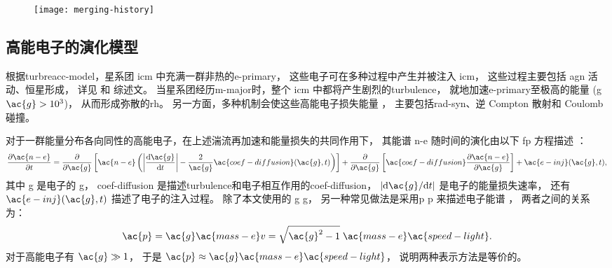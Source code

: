 \begin{figure}[htp]
  \centering
  \texttt{[image: merging-history]}
  \label{fig:merging-history}
\end{figure}

\subsection{高能电子的演化模型}
\label{sec:halo-evo}

根据\ac{turbreacc-model}，星系团 \ac{icm} 中充满一群非热的\ac{e-primary}，
这些电子可在多种过程中产生并被注入 \ac{icm}，
这些过程主要包括 \ac{agn} 活动、恒星形成，
详见  和  综述文。
当星系团经历\ac{m-major}时，整个 \ac{icm} 中都将产生剧烈的\ac{turbulence}，
就地加速\ac{e-primary}至极高的能量 (\acl{g} $\ac{g} > \num{e3}$)，
从而形成弥散的\ac{rh}。
另一方面，多种机制会使这些高能电子损失能量 \cite{sarazin1999}，
主要包括\ac{rad-syn}、逆 Compton 散射和 Coulomb 碰撞。

对于一群能量分布各向同性的高能电子，在上述湍流再加速和能量损失的共同作用下，
其能谱 \ac{n-e} 随时间的演化由以下 \ac{fp} 方程描述
\cite{eilek1991,schlickeiser2002}：
\begin{equation}
  \label{eq:fokkerplanck}
  \pdiff{\ac{n-e}}{t} =
    \pdiff{}{\ac{g}} \left[ \ac{n-e} \left(
      \left| \diff{\ac{g}}{t} \right| -
      \frac{2}{\ac{g}} \ac{coef-diffusion}(\ac{g}, t) \right) \right]
    + \pdiff{}{\ac{g}} \left[
      \ac{coef-diffusion} \pdiff{\ac{n-e}}{\ac{g}} \right]
    + \ac{e-inj}(\ac{g}, t) ,
\end{equation}
其中
\ac{g} 是电子的 \acl{g}，
\ac{coef-diffusion} 是描述\ac{turbulence}和电子相互作用的\acl{coef-diffusion}，
$|\R{d}\ac{g} / \R{d}t|$ 是电子的能量损失速率，
还有 $\ac{e-inj}(\ac{g}, t)$ 描述了电子的注入过程。
除了本文使用的 \acl{g} \ac{g}，
另一种常见做法是采用\acl{p} \ac{p} 来描述电子能谱 \cite{cassano2005,donnert2014}，
两者之间的关系为：
\begin{equation}
  \ac{p} = \ac{g} \ac{mass-e} v
    = \sqrt{\ac{g}^2 - 1} \; \ac{mass-e} \ac{speed-light} .
\end{equation}
对于高能电子有 $\ac{g} \gg 1$，
于是 $\ac{p} \approx \ac{g} \ac{mass-e} \ac{speed-light}$，
说明两种表示方法是等价的。

